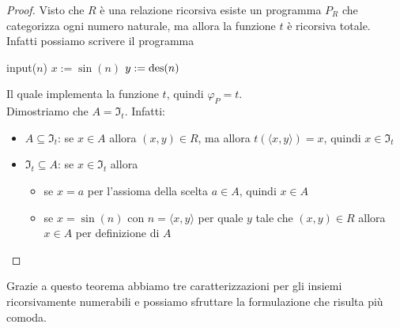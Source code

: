 \begin{proof}
	Visto che $R$ è una relazione ricorsiva esiste un programma $P_R$ che categorizza ogni numero naturale, ma allora la funzione $t$ è ricorsiva totale. Infatti possiamo scrivere il programma
	
	\begin{center}
		\begin{minipage}{.6\textwidth}
			\begin{tcolorbox}[
				colback=white,
				sharp corners,
				boxrule=.3mm,
				left=20pt,
				top=0pt,
				bottom=0pt
				]
				\begin{algorithm}[H]
					\SetAlgoNoEnd
					input($n$)\;
					$x:=\sin(n)$\;
					$y:=\operatorname{des}(n)$\;
				\end{algorithm}
			\end{tcolorbox}
		\end{minipage}
	\end{center}
	
	Il quale implementa la funzione $t$, quindi $\varphi_P = t$.\\
	
	Dimostriamo che $A = \Im_t$. Infatti:
	\begin{itemize}
		\item $A \subseteq \Im_t$: se $x \in A$ allora $(x,y) \in R$, ma allora $t (\langle x,y \rangle) = x$, quindi $x \in \Im_t$
		\item $\Im_t \subseteq A$: se $x \in \Im_t$ allora
		\begin{itemize}
			\item se $x = a$ per l'assioma della scelta $a \in A$, quindi $x \in A$
			\item se $x = \sin(n)$ con $n = \langle x,y \rangle$ per quale $y$ tale che $(x,y) \in R$ allora $x \in A$ per definizione di $A$
		\end{itemize}
	\end{itemize}
	
\end{proof}

Grazie a questo teorema abbiamo tre caratterizzazioni per gli insiemi ricorsivamente numerabili e possiamo sfruttare la formulazione che risulta più comoda.\\

